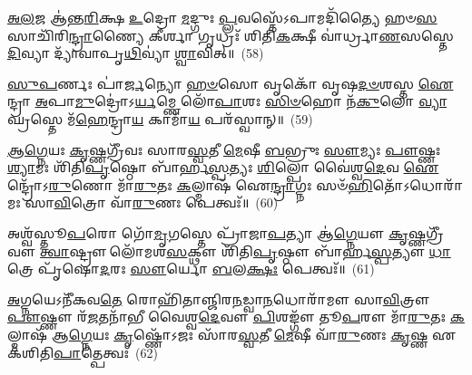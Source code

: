 \-\ul{𑌅}\-\-\ul{𑌲}\-𑌜 𑌆॑𑌨𑍍𑌤\-\ul{𑌰𑌿}\-𑌕𑍍𑌷 \ul{𑌉}\-𑌦𑍍𑌰𑍋 \ul{𑌮}\-𑌦𑍍𑌗𑍁𑌃 \ul{𑌪𑍍𑌲}\-𑌵𑌸𑍍𑌤𑍇᳴\-𑌽𑌪𑌾𑌮𑌦𑌿᳴𑌤𑍍𑌯𑍈 𑌹𑍞\-\ul{𑌸}\-𑌸𑌾𑌚𑌿᳴𑌰𑌿\-\ul{𑌨𑍍𑌦𑍍𑌰𑌾}\-𑌣𑍍𑌯𑍈 𑌕𑍀𑌰𑍍\mbox{}\-\ul{𑌶𑌾} 𑌗𑍃𑌧𑍍𑌰𑌃᳴ 𑌶𑌿𑌤𑌿\-\ul{𑌕}\-𑌕𑍍𑌷𑍀 𑌵𑌾॑𑌰𑍍𑌧𑍍𑌰𑌾\-\ul{𑌣}\-𑌸𑌸𑍍𑌤𑍇 \ul{𑌦𑌿}\-𑌵𑍍𑌯𑌾 𑌦𑍍𑌯𑌾᳴𑌵𑌾𑌪𑍃\-\ul{𑌥𑌿}\-𑌵𑍍𑌯𑌾॑ \ul{𑌶𑍍𑌵𑌾}\-𑌵𑌿𑌤𑍍॥~(58)

{\anuvakamend[{}]}

\-\ul{𑌸𑍁}\-\-\ul{𑌪}\-𑌰𑍍𑌣𑌃 𑌪𑌾॑\-\ul{𑌰𑍍𑌜}\-𑌨𑍍𑌯𑍋 \ul{𑌹}\-\-\ul{𑍞}\-𑌸𑍋 𑌵𑍃𑌕𑍋᳴ 𑌵𑍃𑌷\-\ul{𑌦}\-\-\ul{𑍞}\-𑌶𑌸𑍍𑌤 \ul{𑌐}\-𑌨𑍍𑌦𑍍𑌰𑌾 \ul{𑌅}\-𑌪𑌾\-\ul{𑌮𑍁}\-𑌦𑍍𑌰𑍋॑\-𑌽\-\ul{𑌰𑍍𑌯}\-𑌮𑍍𑌣𑍇 𑌲𑍋᳴\-\ul{𑌪𑌾}\-𑌶𑌃 \ul{𑌸𑌿}\-\-\ul{𑍞}\-𑌹𑍋 𑌨᳴\-\ul{𑌕𑍁}\-𑌲𑍋 \ul{𑌵𑍍𑌯𑌾}\-𑌘𑍍𑌰𑌸𑍍𑌤𑍇 𑌮᳴\-\ul{𑌹𑍇}\-𑌨𑍍𑌦𑍍𑌰𑌾\-\ul{𑌯} 𑌕𑌾𑌮𑌾᳴\-\ul{𑌯} 𑌪𑌰᳴𑌸𑍍𑌵𑌾𑌨𑍍॥~(59)

{\anuvakamend[{\-\ul{𑌅}\-\-\ul{𑌲}\-𑌜𑌃 𑌸𑍁᳴\-\ul{𑌪}\-𑌰𑍍𑌣𑍋॑\-𑌽𑌷𑍍𑌟𑌾𑌦᳴𑌶𑌾\-\ul{𑌷𑍍𑌟𑌾}\-𑌦᳴𑌶}]}%

\-\ul{𑌆}\-\-\ul{𑌗𑍍𑌨𑍇}\-𑌯𑌃 \ul{𑌕𑍃}\-𑌷𑍍𑌣𑌗𑍍𑌰𑍀᳴𑌵𑌃 𑌸𑌾𑌰\-\ul{𑌸𑍍𑌵}\-𑌤𑍀 \ul{𑌮𑍇}\-𑌷𑍀 \ul{𑌬}\-𑌭𑍍𑌰𑍁𑌃 \ul{𑌸𑍗}\-𑌮𑍍𑌯𑌃 \ul{𑌪𑍗}\-𑌷𑍍𑌣𑌃 \ul{𑌶𑍍𑌯𑌾}\-𑌮𑌃 𑌶𑌿᳴𑌤𑌿\-\ul{𑌪𑍃}\-𑌷𑍍𑌠𑍋 𑌬𑌾᳴𑌰𑍍\mbox{}𑌹\-\ul{𑌸𑍍𑌪}\-𑌤𑍍𑌯𑌃 \ul{𑌶𑌿}\-𑌲𑍍𑌪𑍋 𑌵𑍈॑𑌶𑍍𑌵\-\ul{𑌦𑍇}\-𑌵 \ul{𑌐}\-𑌨𑍍𑌦𑍍𑌰𑍋᳴\-𑌽\-\ul{𑌰𑍁}\-𑌣𑍋 𑌮𑌾᳴\-\ul{𑌰𑍁}\-𑌤𑌃 \ul{𑌕}\-𑌲𑍍𑌮𑌾𑌷᳴ 𑌐\-\ul{𑌨𑍍𑌦𑍍𑌰𑌾}\-𑌗𑍍𑌨𑌃 𑌸𑍞᳴\-\ul{𑌹𑌿}\-𑌤𑍋᳴\-𑌽𑌧𑍋𑌰𑌾᳴𑌮𑌃 𑌸𑌾\-\ul{𑌵𑌿}\-𑌤𑍍𑌰𑍋 𑌵𑌾᳴\-\ul{𑌰𑍁}\-𑌣𑌃 𑌪𑍇𑌤𑍍𑌵𑌃᳴॥~(60)

{\anuvakamend[{\-\ul{𑌆}\-\-\ul{𑌗𑍍𑌨𑍇}\-𑌯𑍋 𑌦𑍍𑌵𑌾𑌵𑌿𑍞᳴𑌶𑌤𑌿𑌃}]}%

𑌅𑌶𑍍𑌵᳴𑌸𑍍𑌤𑍂\-\ul{𑌪}\-𑌰𑍋 𑌗𑍋᳴\-\ul{𑌮𑍃}\-𑌗𑌸𑍍𑌤𑍇 𑌪𑍍𑌰𑌾᳴𑌜𑌾\-\ul{𑌪}\-𑌤𑍍𑌯𑌾 𑌆॑\-\ul{𑌗𑍍𑌨𑍇}\-𑌯𑍗 \ul{𑌕𑍃}\-𑌷𑍍𑌣𑌗𑍍𑌰𑍀᳴𑌵𑍗 \ul{𑌤𑍍𑌵𑌾}\-𑌷𑍍𑌟𑍍𑌰𑍗 𑌲𑍋᳴𑌮𑌶\-\ul{𑌸}\-𑌕𑍍𑌥𑍗 𑌶𑌿᳴𑌤𑌿\-\ul{𑌪𑍃}\-𑌷𑍍𑌠𑍗 𑌬𑌾᳴𑌰𑍍\mbox{}𑌹\-\ul{𑌸𑍍𑌪}\-𑌤𑍍𑌯𑍗 \ul{𑌧𑌾}\-𑌤𑍍𑌰𑍇 𑌪𑍃᳴𑌷𑍋\-\ul{𑌦}\-𑌰𑌃 \ul{𑌸𑍗}\-𑌰𑍍𑌯𑍋 \ul{𑌬}\-𑌲\-\ul{𑌕𑍍𑌷𑌃} 𑌪𑍇𑌤𑍍𑌵𑌃᳴॥~(61)

{\anuvakamend[{𑌅\-\ul{𑌶𑍍𑌵𑌃} 𑌷𑍋𑌡᳴𑌶}]}%

\-\ul{𑌅}\-𑌗𑍍𑌨𑌯𑍇\-𑌽𑌨𑍀᳴𑌕𑌵\-\ul{𑌤𑍇} 𑌰𑍋𑌹𑌿᳴𑌤𑌾𑌞𑍍𑌜𑌿𑌰\-\ul{𑌨}\-𑌡𑍍𑌵𑌾\-\ul{𑌨}\-𑌧𑍋𑌰𑌾᳴𑌮𑍗 𑌸𑌾\-\ul{𑌵𑌿}\-𑌤𑍍𑌰𑍗 \ul{𑌪𑍗}\-𑌷𑍍𑌣𑍗 𑌰᳴\-\ul{𑌜}\-𑌤𑌨𑌾᳴𑌭𑍀 𑌵𑍈𑌶𑍍𑌵\-\ul{𑌦𑍇}\-𑌵𑍗 \ul{𑌪𑌿}\-𑌶𑌙𑍍𑌗𑍗᳴ 𑌤𑍂\-\ul{𑌪}\-𑌰𑍗 𑌮𑌾᳴\-\ul{𑌰𑍁}\-𑌤𑌃 \ul{𑌕}\-𑌲𑍍𑌮𑌾𑌷᳴ 𑌆\-\ul{𑌗𑍍𑌨𑍇}\-𑌯𑌃 \ul{𑌕𑍃}\-𑌷𑍍𑌣𑍋᳴\-𑌽𑌜𑌃 𑌸𑌾᳴𑌰\-\ul{𑌸𑍍𑌵}\-𑌤𑍀 \ul{𑌮𑍇}\-𑌷𑍀 𑌵𑌾᳴\-\ul{𑌰𑍁}\-𑌣𑌃 \ul{𑌕𑍃}\-𑌷𑍍𑌣 𑌏𑌕᳴𑌶𑌿𑌤𑌿\-\ul{𑌪𑌾}\-𑌤𑍍𑌪𑍇𑌤𑍍𑌵𑌃᳴~(62)


{\anuvakamend[{\-\ul{𑌅}\-𑌗𑍍𑌨𑌯𑍋\-𑌽𑌨𑍀᳴𑌕𑌵\-\ul{𑌤𑍇} 𑌦𑍍𑌵𑌾𑌵𑌿𑍞᳴𑌶𑌤𑌿𑌃}]}%

{}%

